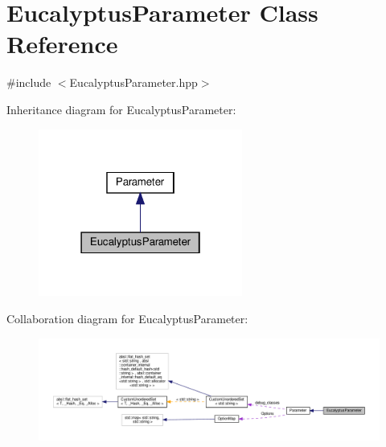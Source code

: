 \hypertarget{classEucalyptusParameter}{}\section{Eucalyptus\+Parameter Class Reference}
\label{classEucalyptusParameter}


{\ttfamily \#include $<$Eucalyptus\+Parameter.\+hpp$>$}



Inheritance diagram for Eucalyptus\+Parameter\+:
\nopagebreak
\begin{figure}[H]
\begin{center}
\leavevmode
\includegraphics[width=190pt]{d4/d75/classEucalyptusParameter__inherit__graph}
\end{center}
\end{figure}


Collaboration diagram for Eucalyptus\+Parameter\+:
\nopagebreak
\begin{figure}[H]
\begin{center}
\leavevmode
\includegraphics[width=350pt]{d4/dd9/classEucalyptusParameter__coll__graph}
\end{center}
\end{figure}

